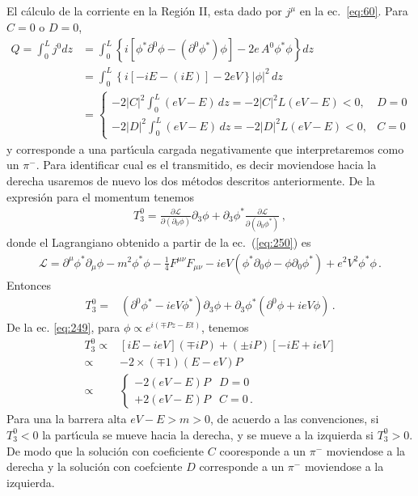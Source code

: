 El c\'alculo de la corriente en la Regi\'on II, esta dado por $j^\mu$ en la ec.~\eqref{eq:60}. Para $C=0$ o $D=0$,
\begin{align}
  Q=\int_0^L j^0dz&=\int_0^L\left\{i\left[\phi^*\partial^0\phi-\left(\partial^0\phi^*\right)\phi\right]-2e\,A^0\phi^*\phi\right\}dz\nonumber\\
&=\int_0^L\left\{i[-iE-(iE)]-2eV\right\}|\phi|^2\,dz\nonumber\\
&=\begin{cases}
  -2|C|^2\int_0^L (eV-E)\,dz=-2|C|^2 L (eV-E)\lt 0, & D=0\\
-2|D|^2\int_0^L (eV-E)\,dz=-2|D|^2 L (eV-E)\lt 0, & C=0
\end{cases}
\end{align}
y corresponde a una part\'\i cula cargada negativamente que interpretaremos como un $\pi^-$. Para identificar cual es el transmitido, es decir moviendose hacia la derecha usaremos de nuevo los dos m\'etodos descritos anteriormente. De la expresi\'on para el momentum tenemos
\begin{align}
  T^0_3=\frac{\partial\mathcal{L}}{\partial(\partial_0\phi)}\partial_3\phi+\partial_3\phi^*\frac{\partial\mathcal{L}}{\partial(\partial_0\phi^*)}\,,
\end{align}
donde el Lagrangiano obtenido a partir de la ec.~(\ref{eq:250}) es
\begin{align}
  \mathcal{L}=\partial^\mu\phi^*\partial_\mu\phi-m^2\phi^*\phi-\frac{1}{4}F^{\mu\nu}F_{\mu\nu}-i e V(\phi^*\partial_0\phi-\phi\partial_0\phi^*)+e^2{V}^2\phi^*\phi\,.
\end{align}
Entonces
\begin{align}
  T^0_3=&(\partial^0\phi^*-i e V\phi^*)\partial_3\phi+\partial_3\phi^*(\partial^0\phi+i e V\phi)\,.
\end{align}
De la ec. \eqref{eq:249}, para $\phi\propto e^{i(\mp P z-E t)}$, tenemos
\begin{align}
  T^0_3\propto&[i E-i e V](\mp i P)+(\pm i P)[-i E+i e V]\nonumber\\
  \propto&-2\times(\mp1)(E- e V)P\nonumber\\
  \propto&
  \begin{cases}
    -2(e V-E)P&D=0\\
    +2(e V-E)P&C=0\,.
  \end{cases}
\end{align}
Para una la barrera alta $eV-E>m>0$, de acuerdo a las convenciones, si $T^0_3<0$ la part\'\i cula se mueve hacia la derecha, y se mueve a la izquierda si $T^0_3>0$. De modo que la soluci\'on con coeficiente $C$ cooresponde a un $\pi^-$ moviendose a la derecha y la soluci\'on con coefciente $D$ corresponde a un $\pi^-$ moviendose a la izquierda. 
